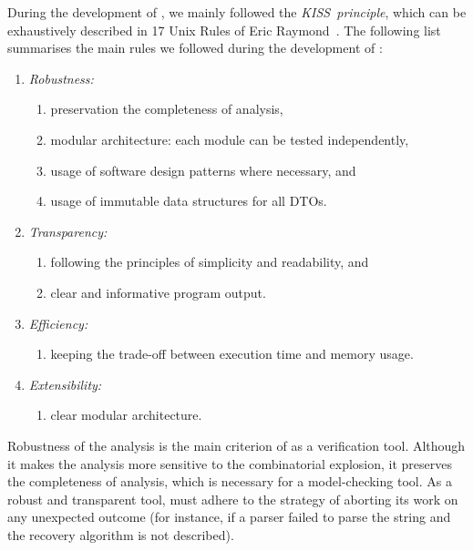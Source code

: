 During the development of \porthos[2], we mainly followed the \textit{KISS~principle}, which can be exhaustively described in 17 Unix Rules of Eric Raymond~\cite{raymond2003art}.
The following list summarises the main rules we followed during the development of \porthos[2]:

\vspace{0.5em}
\begin{enumerate}[nolistsep]
  \item \textit{Robustness:}
    \begin{enumerate}[label*=\arabic*.]
      \item preservation the completeness of analysis,
      \item modular architecture: each module can be tested independently,
      \item usage of software design patterns where necessary, and
      \item usage of immutable data structures for all DTOs.
    \end{enumerate}
  \item \textit{Transparency:}
    \begin{enumerate}[label*=\arabic*.]
      \item following the principles of simplicity and readability, and
      \item clear and informative program output.
    \end{enumerate}
  \item \textit{Efficiency:}
    \begin{enumerate}[label*=\arabic*.]%
      \item keeping the trade-off between execution time and memory usage.
    \end{enumerate}
  \item \textit{Extensibility:}
    \begin{enumerate}[label*=\arabic*.]%
      \item clear modular architecture.
    \end{enumerate}
\end{enumerate}

Robustness of the analysis is the main criterion of \porthos[2] as a verification tool.
Although it makes the analysis more sensitive to the combinatorial explosion, it preserves the completeness of analysis, which is necessary for a model-checking tool.
As a robust and transparent tool, \porthos[2] must adhere to the strategy of aborting its work on any unexpected outcome (for instance, if a parser failed to parse the string and the recovery algorithm is not described).

